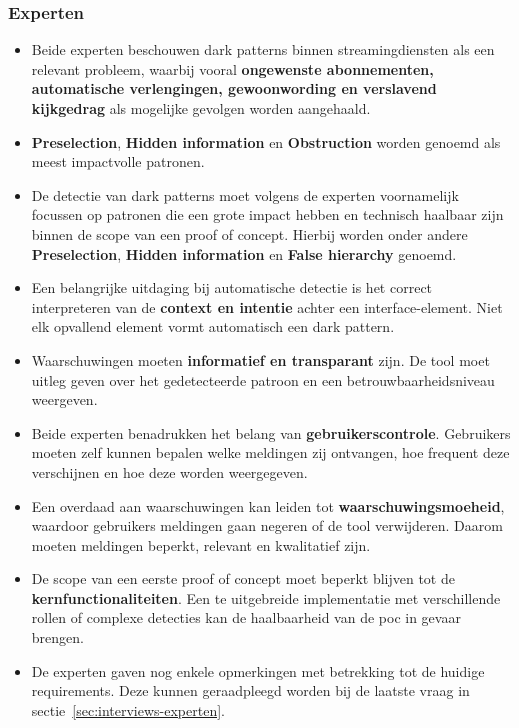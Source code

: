 \vspace{1em}

\subsubsection{Experten}

\vspace{1em}

\begin{itemize}
    \item Beide experten beschouwen dark patterns binnen streamingdiensten als een relevant probleem, waarbij vooral \textbf{ongewenste abonnementen, automatische verlengingen, gewoonwording en verslavend kijkgedrag} als mogelijke gevolgen worden aangehaald. 
    \item \textbf{Preselection}, \textbf{Hidden information} en \textbf{Obstruction} worden genoemd als meest impactvolle patronen.
    \item De detectie van dark patterns moet volgens de experten voornamelijk focussen op patronen die een grote impact hebben en technisch haalbaar zijn binnen de scope van een proof of concept. Hierbij worden onder andere \textbf{Preselection}, \textbf{Hidden information} en \textbf{False hierarchy} genoemd.
    \item Een belangrijke uitdaging bij automatische detectie is het correct interpreteren van de \textbf{context en intentie} achter een interface-element. Niet elk opvallend element vormt automatisch een dark pattern.
    \item Waarschuwingen moeten \textbf{informatief en transparant} zijn. De tool moet uitleg geven over het gedetecteerde patroon en een betrouwbaarheidsniveau weergeven.
    \item Beide experten benadrukken het belang van \textbf{gebruikerscontrole}. Gebruikers moeten zelf kunnen bepalen welke meldingen zij ontvangen, hoe frequent deze verschijnen en hoe deze worden weergegeven.
    \item Een overdaad aan waarschuwingen kan leiden tot \textbf{waarschuwingsmoeheid}, waardoor gebruikers meldingen gaan negeren of de tool verwijderen. Daarom moeten meldingen beperkt, relevant en kwalitatief zijn.
    \item De scope van een eerste proof of concept moet beperkt blijven tot de \textbf{kernfunctionaliteiten}. Een te uitgebreide implementatie met verschillende rollen of complexe detecties kan de haalbaarheid van de \acrshort{poc} in gevaar brengen.
    \item De experten gaven nog enkele opmerkingen met betrekking tot de huidige requirements. Deze kunnen geraadpleegd worden bij de laatste vraag in sectie~\ref{sec:interviews-experten}.
\end{itemize}

